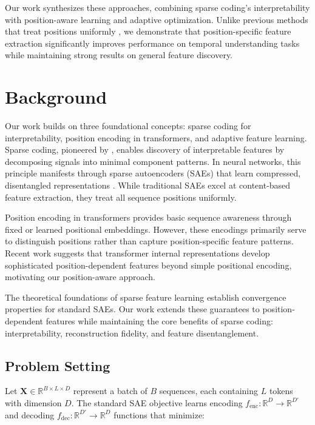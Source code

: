 \documentclass{article} %
\begin{document}
Our work synthesizes these approaches, combining sparse coding's interpretability with position-aware learning and adaptive optimization. Unlike previous methods that treat positions uniformly \cite{Zhang2020ASO}, we demonstrate that position-specific feature extraction significantly improves performance on temporal understanding tasks while maintaining strong results on general feature discovery.

\section{Background}
\label{sec:background}

Our work builds on three foundational concepts: sparse coding for interpretability, position encoding in transformers, and adaptive feature learning. Sparse coding, pioneered by \cite{Olshausen1997SparseCW}, enables discovery of interpretable features by decomposing signals into minimal component patterns. In neural networks, this principle manifests through sparse autoencoders (SAEs) that learn compressed, disentangled representations \cite{Cunningham2023SparseAF}. While traditional SAEs excel at content-based feature extraction, they treat all sequence positions uniformly.

Position encoding in transformers \cite{vaswani2017attention} provides basic sequence awareness through fixed or learned positional embeddings. However, these encodings primarily serve to distinguish positions rather than capture position-specific feature patterns. Recent work \cite{Conmy2023TowardsAC} suggests that transformer internal representations develop sophisticated position-dependent features beyond simple positional encoding, motivating our position-aware approach.

The theoretical foundations of sparse feature learning \cite{Li2024ConvergenceAF} establish convergence properties for standard SAEs. Our work extends these guarantees to position-dependent features while maintaining the core benefits of sparse coding: interpretability, reconstruction fidelity, and feature disentanglement.

\subsection{Problem Setting}
Let $\mathbf{X} \in \mathbb{R}^{B \times L \times D}$ represent a batch of $B$ sequences, each containing $L$ tokens with dimension $D$. The standard SAE objective learns encoding $f_{\text{enc}}: \mathbb{R}^D \rightarrow \mathbb{R}^{D'}$ and decoding $f_{\text{dec}}: \mathbb{R}^{D'} \rightarrow \mathbb{R}^D$ functions that minimize:
\end{document}
